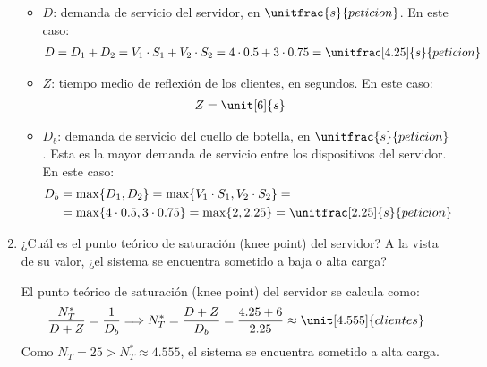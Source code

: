 \begin{ejercicio}
\begin{enumerate}
\begin{itemize}
            \item $D$: demanda de servicio del servidor, en $\unitfrac{s}{peticion}$. En este caso:
            \begin{align*}
                D &= D_1 + D_2 = V_1 \cdot S_1 + V_2 \cdot S_2 = 4 \cdot 0.5 + 3 \cdot 0.75 = \unitfrac[4.25]{s}{peticion}
            \end{align*}
            \item $Z$: tiempo medio de reflexión de los clientes, en segundos. En este caso:
            \begin{align*}
                Z &= \unit[6]{s}
            \end{align*}
            \item $D_b$: demanda de servicio del cuello de botella, en $\unitfrac{s}{peticion}$. Esta es la mayor demanda de servicio entre los dispositivos del servidor. En este caso:
            \begin{align*}
                D_b &= \max\{D_1, D_2\} = \max\{V_1 \cdot S_1, V_2 \cdot S_2\} =\\&= \max\{4 \cdot 0.5, 3 \cdot 0.75\} = \max\{2, 2.25\} = \unitfrac[2.25]{s}{peticion}
            \end{align*}
        \end{itemize}
        \item ¿Cuál es el punto teórico de saturación (knee point) del servidor? A la vista de su valor, ¿el sistema se encuentra sometido a baja o alta carga?
        
        El punto teórico de saturación (knee point) del servidor se calcula como:
        \begin{align*}
            \dfrac{N_T^*}{D + Z} = \dfrac{1}{D_b}
            \Longrightarrow N_T^* = \dfrac{D+Z}{D_b} = \dfrac{4.25 + 6}{2.25} \approx \unit[4.555]{clientes}
        \end{align*}
        Como $N_T = 25 > N_T^* \approx 4.555$, el sistema se encuentra sometido a alta carga.
    \end{enumerate}
\end{ejercicio}
\begin{comment}
\solucion
    \begin{enumerate}
        \item $N_T = 25$ clientes; $D = 4.25$ s/petición al servidor (suma de demandas de servicio); $Z = 6$ s (tiempo medio de reflexión de los clientes); $D_b = 2.25$ s/petición al servidor (demanda de servicio del cuello de botella, en nuestro caso: la red). Entonces, $X_0 \leq 0.44$ peticiones al servidor por segundo (productividad del servidor).
        \item El punto teórico de saturación es $N_T^* = 4.6$ clientes. Como $N_T >> N_T^*$ el servidor se encuentra sometido a alta carga. Por lo tanto, $X_0$ será un valor próximo, aunque inferior, a 0.44 peticiones/s.
    \end{enumerate}
\end{comment}

